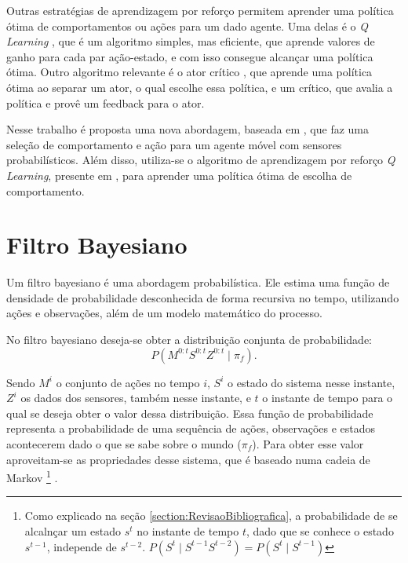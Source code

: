 Outras estratégias de aprendizagem por reforço permitem aprender uma política ótima de comportamentos ou ações para um dado agente. Uma delas é o \textit{Q Learning} \cite{sutton1998reinforcement,KLMSurvey}, que é um algoritmo simples, mas eficiente, que aprende valores de ganho para cada par ação-estado, e com isso consegue alcançar uma política ótima. Outro algoritmo relevante é o ator crítico \cite{sutton1998reinforcement,RicAbeYu07,conf:nips:BhatnagarSGL07,Konda01actor-criticalgorithms}, que aprende uma política ótima ao separar um ator, o qual escolhe essa política, e um crítico, que avalia a política e provê um feedback para o ator.

Nesse trabalho é proposta uma nova abordagem, baseada em \cite{Koike:2005,lidoris2008}, que faz uma seleção de comportamento e ação para um agente móvel com sensores probabilísticos. Além disso, utiliza-se o algoritmo de aprendizagem por reforço \textit{Q Learning}, presente em \cite{sutton1998reinforcement}, para aprender uma política ótima de escolha de comportamento.


\section{Filtro Bayesiano} \label{section:FiltroBayesiano}

Um filtro bayesiano é uma abordagem probabilística. Ele estima uma função de densidade de probabilidade desconhecida de forma recursiva no tempo, utilizando ações e observações, além de um modelo matemático do processo.

No filtro bayesiano deseja-se obter a distribuição conjunta de probabilidade:
\begin{equation} \label{equation:DistribuicaoConjuntaProbabilistica}
	P ( M^{0: t} S^{0: t} Z^{0: t} \mid \pi_f ).
\end{equation}

Sendo $ M^i $ o conjunto de ações no tempo $ i $, $ S^i $ o estado do sistema nesse instante, $ Z^i $ os dados dos sensores, também nesse instante, e $ t $ o instante de tempo para o qual se deseja obter o valor dessa distribuição. Essa função de probabilidade representa a probabilidade de uma sequência de ações, observações e estados acontecerem dado o que se sabe sobre o mundo ($ \pi_f $). Para obter esse valor aproveitam-se as propriedades desse sistema, que é baseado numa cadeia de Markov%
\footnote{Como explicado na seção \ref{section:RevisaoBibliografica}, a probabilidade de se alcalnçar um estado $ s^t $ no instante de tempo $ t $, dado que se conhece o estado $ s^{t-1} $, independe de $ s^{t-2} $. $ P(S^t\mid S^{t-1}S^{t-2})=P(S^t\mid S^{t-1}) $%
}%
.

